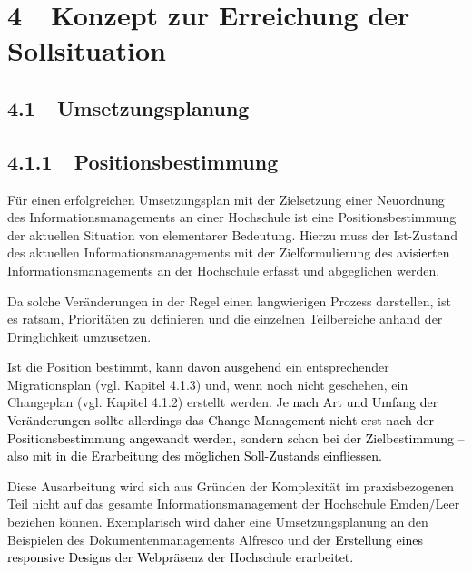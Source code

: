 \documentclass[a4paper]{article}
\title{}
\begin{document}
\section[4\ \ Konzept zur Erreichung der Sollsituation]{4\ \ Konzept zur Erreichung der Sollsituation}
\subsection[4.1\ \ Umsetzungsplanung]{\bfseries 4.1\ \ Umsetzungsplanung}
\subsection[4.1.1\ \ Positionsbestimmung]{\bfseries 4.1.1\ \ Positionsbestimmung}
{\sffamily
Für einen erfolgreichen Umsetzungsplan mit der Zielsetzung einer Neuordnung des Informationsmanagements an einer
Hochschule ist eine Positionsbestimmung der aktuellen Situation von elementarer Bedeutung. Hierzu muss der Ist-Zustand
des aktuellen Informationsmanagements mit der Zielformulierung \textcolor{black}{des avisierten
}Informationsmanagements an der Hochschule erfasst und abgeglichen werden. }


\bigskip

{\sffamily
Da solche Veränderungen in der Regel einen langwierigen Prozess darstellen, ist es ratsam, Prioritäten zu definieren und
die einzelnen Teilbereiche anhand der Dringlichkeit umzusetzen. }


\bigskip

{\sffamily
Ist die Position bestimmt, kann \textcolor{black}{davon ausgehend} ein entsprechender Migrationsplan (vgl. Kapitel
4.1.3) und, wenn noch nicht geschehen, ein Changeplan (vgl. Kapitel 4.1.2) erstellt werden. J\textcolor{black}{e nach
Art und Umfang der Veränderungen sollte allerdings das Change Management nicht erst nach der Positionsbestimmung
angewandt werden, sondern schon bei der Zielbestimmung – also mit in die Erarbeitung des möglichen Soll-Zustands
einfliessen. }}


\bigskip

{\sffamily
Diese Ausarbeitung wird sich aus Gründen der Komplexität im praxisbezogenen Teil nicht auf das gesamte
Informationsmanagement der Hochschule Emden/Leer beziehen können. Exemplarisch wird daher eine Umsetzungsplanung an den
Beispielen des Dokumentenmanagements Alfresco und der\textcolor{black}{ Erstellung eines responsive Designs der
Webpräsenz der Hochschule erarbeitet.}}


\bigskip


\bigskip
\end{document}
